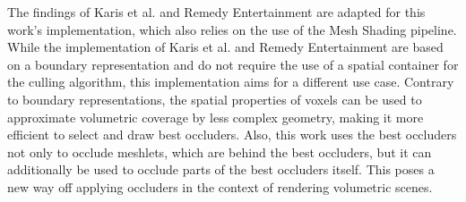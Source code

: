 \noindent
The findings of Karis et al. and Remedy Entertainment are adapted for this work's implementation, which also relies on 
the use of the Mesh Shading pipeline. While the implementation of Karis et al. and Remedy Entertainment are based on 
a boundary representation and do not require the use of a spatial container for the culling algorithm, this 
implementation aims for a different use case. Contrary to boundary representations, the spatial properties of voxels 
can be used to approximate volumetric coverage by less complex geometry, making it more efficient to select and draw 
best occluders. Also, this work uses the best occluders not only to occlude meshlets, which are behind the best occluders, 
but it can additionally be used to occlude parts of the best occluders itself. This poses a new way off applying occluders 
in the context of rendering volumetric scenes.


